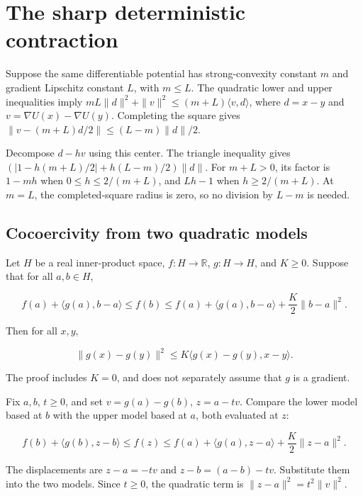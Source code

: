 \documentclass[11pt,a4paper]{report}
\begin{document}
\section{\texorpdfstring{The sharp deterministic contraction}{The sharp deterministic contraction}}
\label{proof-module-UnadjustedLangevin-SharpContraction-lean}


Suppose the same differentiable potential has strong-convexity constant \(m\) and gradient Lipschitz constant \(L\), with \(m\le L\). The quadratic lower and upper inequalities imply \(mL\|d\|^2+\|v\|^2\le(m+L)\langle v,d\rangle\), where \(d=x-y\) and \(v=\nabla U(x)-\nabla U(y)\). Completing the square gives \(\|v-(m+L)d/2\|\le(L-m)\|d\|/2\).



Decompose \(d-hv\) using this center. The triangle inequality gives \((|1-h(m+L)/2|+h(L-m)/2)\|d\|\). For \(m+L>0\), its factor is \(1-mh\) when \(0\le h\le2/(m+L)\), and \(Lh-1\) when \(h\ge2/(m+L)\). At \(m=L\), the completed-square radius is zero, so no division by \(L-m\) is needed.

\subsection{\texorpdfstring{Cocoercivity from two quadratic models}{Cocoercivity from two quadratic models}}
\label{report-step-UnadjustedLangevin-SharpContraction-lean-1}


Let \(H\) be a real inner-product space, \(f:H\to\mathbb R\), \(g:H\to H\), and \(K\ge0\). Suppose that for all \(a,b\in H\),

\[f(a)+\langle g(a),b-a\rangle\le f(b)\le f(a)+\langle g(a),b-a\rangle+\frac K2\|b-a\|^2.\]

Then for all \(x,y\),

\[\|g(x)-g(y)\|^2\le K\langle g(x)-g(y),x-y\rangle.\]

The proof includes \(K=0\), and does not separately assume that \(g\) is a gradient.



Fix \(a,b\), \(t\ge0\), and set \(v=g(a)-g(b)\), \(z=a-tv\). Compare the lower model based at \(b\) with the upper model based at \(a\), both evaluated at \(z\):

\[f(b)+\langle g(b),z-b\rangle\le f(z)\le f(a)+\langle g(a),z-a\rangle+\frac K2\|z-a\|^2.\]

The displacements are \(z-a=-tv\) and \(z-b=(a-b)-tv\). Substitute them into the two models. Since \(t\ge0\), the quadratic term is \(\|z-a\|^2=t^2\|v\|^2\).
\end{document}

